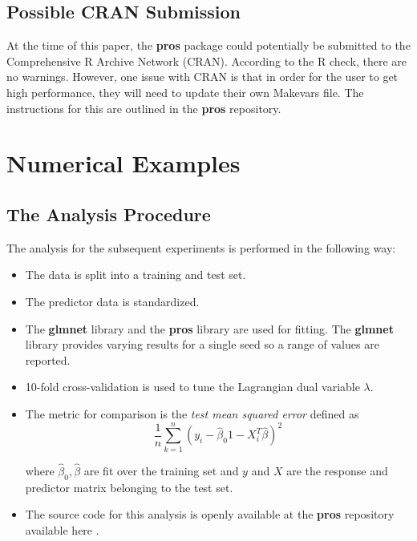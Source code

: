\documentclass[article]{jss}
\numberwithin{equation}{section}
\begin{document}
\subsection{Possible CRAN Submission}

At the time of this paper, the \textbf{pros} package could potentially be submitted to the Comprehensive R Archive Network (CRAN).
According to the R check, there are no warnings.
However, one issue with CRAN is that in order for the user to get high performance, they will need to update their own Makevars file. The instructions for this are outlined in the \textbf{pros} repository.

\section{Numerical Examples}

\subsection{The Analysis Procedure}

The analysis for the subsequent experiments is performed in the following way:

\begin{itemize}

\item The data is split into a training and test set.

\item The predictor data is standardized.

\item The \textbf{glmnet} library and the \textbf{pros} library are used for fitting. The \textbf{glmnet} library provides varying results for a single seed so a range of values are reported.

\item 10-fold cross-validation is used to tune the Lagrangian dual variable $\lambda$.

\item The metric for comparison is the \textit{test mean squared error} defined as
\[
\frac{1}{n}\sum_{k = 1}^n \left( y_i - \hat \beta_0 1 - X_i^T \hat \beta \right)^2
\]

where $\hat \beta_0, \hat \beta$ are fit over the training set and $y$ and $X$ are the response and predictor matrix belonging to the test set.

\item The source code for this analysis is openly available at the \textbf{pros} repository available here \cite{pros}.

\end{itemize}
\end{document}
